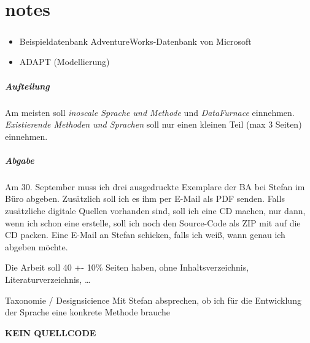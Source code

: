 \chapter{notes}
\paragraph{}
\begin{itemize}
  \item Beispieldatenbank AdventureWorks-Datenbank von Microsoft
  \item ADAPT (Modellierung)
\end{itemize}

\paragraph{Aufteilung}
Am meisten soll \textit{inoscale Sprache und Methode} und \textit{DataFurnace} einnehmen. \textit{Existierende Methoden und Sprachen} soll nur einen kleinen Teil (max 3 Seiten) einnehmen.

\paragraph{Abgabe}
Am 30. September muss ich drei ausgedruckte Exemplare der BA bei Stefan im Büro
abgeben. Zusätzlich soll ich es ihm per E-Mail als PDF senden. Falls
zusätzliche digitale Quellen vorhanden sind, soll ich eine CD machen, nur dann,
wenn ich schon eine erstelle, soll ich noch den Source-Code als ZIP mit auf die
CD packen. Eine E-Mail an Stefan schicken, falls ich weiß, wann genau ich
abgeben möchte.

Die Arbeit soll 40 +- 10\% Seiten haben, ohne Inhaltsverzeichnis, Literaturverzeichnis, \ldots


Taxonomie / Designsicience 
Mit Stefan absprechen, ob ich für die Entwicklung der Sprache eine konkrete
Methode brauche

\textbf{KEIN QUELLCODE}
